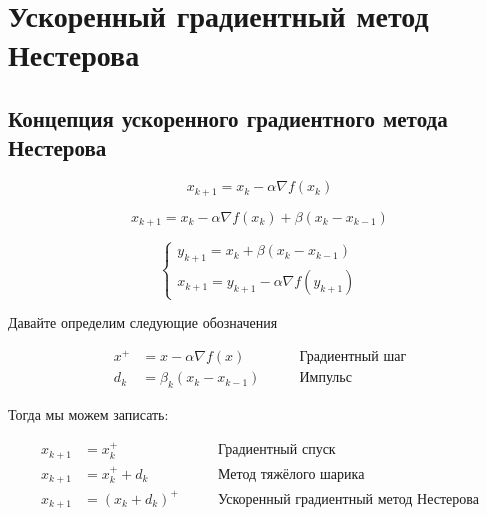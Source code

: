 \documentclass[
  russian,
  letterpaper,
  DIV=11,
  numbers=noendperiod]{scrartcl}
\begin{document}
\section{Ускоренный градиентный метод
Нестерова}\label{ux443ux441ux43aux43eux440ux435ux43dux43dux44bux439-ux433ux440ux430ux434ux438ux435ux43dux442ux43dux44bux439-ux43cux435ux442ux43eux434-ux43dux435ux441ux442ux435ux440ux43eux432ux430}

\subsection{Концепция ускоренного градиентного метода
Нестерова}\label{ux43aux43eux43dux446ux435ux43fux446ux438ux44f-ux443ux441ux43aux43eux440ux435ux43dux43dux43eux433ux43e-ux433ux440ux430ux434ux438ux435ux43dux442ux43dux43eux433ux43e-ux43cux435ux442ux43eux434ux430-ux43dux435ux441ux442ux435ux440ux43eux432ux430}

\[
x_{k+1} = x_k - \alpha \nabla f(x_k)
\]

\[
x_{k+1} = x_k - \alpha \nabla f(x_k) + \beta (x_k - x_{k-1})
\]

\[
\begin{cases}y_{k+1} = x_k + \beta (x_k - x_{k-1}) \\ x_{k+1} = y_{k+1} - \alpha \nabla f(y_{k+1}) \end{cases}
\]

Давайте определим следующие обозначения

\[
\begin{aligned}
x^+ &= x - \alpha \nabla f(x) \qquad &\text{Градиентный шаг} \\
d_k &= \beta_k (x_k - x_{k-1}) \qquad &\text{Импульс}
\end{aligned}
\]

Тогда мы можем записать:

\[
\begin{aligned}
x_{k+1} &= x_k^+ \qquad &\text{Градиентный спуск} \\
x_{k+1} &= x_k^+ + d_k \qquad &\text{Метод тяжёлого шарика} \\
x_{k+1} &= (x_k + d_k)^+ \qquad &\text{Ускоренный градиентный метод Нестерова}
\end{aligned}
\]

\centering
\end{document}
